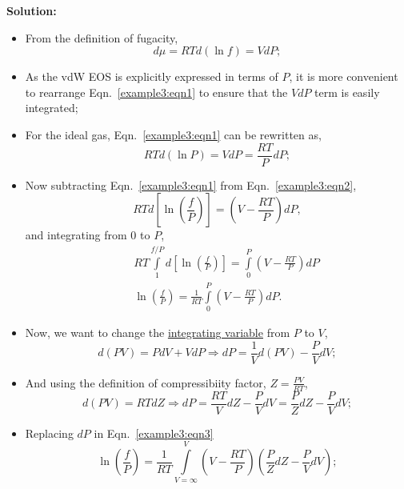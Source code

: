 \documentclass[12pts,a4paper,amsmath,amssymb,floatfix]{article}%
\newcommand{\frc}{\displaystyle\frac}
\begin{document}
\begin{enumerate}[label=\bfseries Example \arabic*]
{\bf Solution:}
\begin{itemize}
  \item From the definition of fugacity,
      \begin{equation}
           d\mu = RTd\left(\ln f\right) = VdP;\label{example3:eqn1}
      \end{equation}
  \item As the vdW EOS is explicitly expressed in terms of $P$, it is more convenient to rearrange Eqn.~\ref{example3:eqn1} to ensure that the $VdP$ term is easily integrated;
  \item For the ideal gas, Eqn.~\ref{example3:eqn1} can be rewritten as,
      \begin{equation}
           RTd\left(\ln P\right) = VdP = \frc{RT}{P}dP;\label{example3:eqn2}
      \end{equation}
  \item Now subtracting Eqn.~\ref{example3:eqn1} from Eqn.~\ref{example3:eqn2},
      \begin{displaymath}
           RTd\left[\ln\left(\frc{f}{P}\right)\right] = \left(V-\frc{RT}{P}\right)dP, 
      \end{displaymath}
      and integrating from $0$ to $P$,
      \begin{eqnarray}
           && RT\int\limits_{1}^{f/P}d\left[\ln\left(\frc{f}{P}\right)\right] = \int\limits_{0}^{P}\left(V-\frc{RT}{P}\right)dP \nonumber \\
           && \ln\left(\frc{f}{P}\right) = \frc{1}{RT} \int\limits_{0}^{P}\left(V-\frc{RT}{P}\right)dP.\label{example3:eqn3}
      \end{eqnarray}
   \item Now, we want to change the \underline{integrating variable} from $P$ to $V$,
      \begin{displaymath}
         d(PV) = PdV + VdP \Longrightarrow dP = \frc{1}{V}d(PV) - \frc{P}{V}dV;
      \end{displaymath}
   \item And using the definition of compressibiity factor, $Z=\frc{PV}{RT}$,
       \begin{displaymath}
          d(PV) = RT dZ \Longrightarrow dP = \frc{RT}{V}dZ - \frc{P}{V}dV = \frc{P}{Z}dZ - \frc{P}{V}dV;
       \end{displaymath}
   \item Replacing $dP$ in Eqn.~\ref{example3:eqn3}
       \begin{equation}
          \ln\left(\frc{f}{P}\right) = \frc{1}{RT} \int\limits_{V=\infty}^{V}\left(V-\frc{RT}{P}\right)\left(\frc{P}{Z}dZ-\frc{P}{V}dV\right)\label{example3:eqn4};

\end{equation}
\end{itemize}
\end{enumerate}
\end{document}
